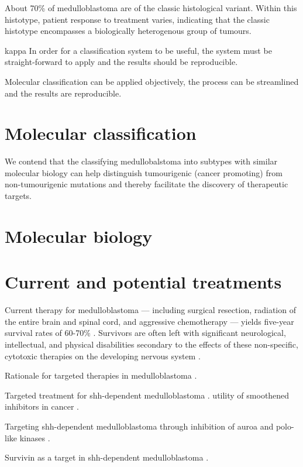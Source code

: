About 70\% of medulloblastoma are of the classic histological variant. Within this histotype, patient response to treatment varies, indicating that the classic histotype encompasses a biologically heterogenous group of tumours.

kappa
In order for a classification system to be useful, the system must be straight-forward to apply and the results should be reproducible.

Molecular classification can be applied objectively, the process can be streamlined and the results are reproducible.

\section{Molecular classification}

We contend that the classifying medullobalstoma into subtypes with similar molecular biology can help distinguish tumourigenic (cancer promoting) from non-tumourigenic mutations and thereby facilitate the discovery of therapeutic targets. 

\section{Molecular biology}


\section{Current and potential treatments}

Current therapy for medulloblastoma --- including surgical resection, radiation of the entire brain and spinal cord, and aggressive chemotherapy --- yields five-year survival rates of 60-70\% . Survivors are often left with significant neurological, intellectual, and physical disabilities secondary to the effects of these non-specific, cytotoxic therapies on the developing nervous system .

Rationale for targeted therapies in medulloblastoma .

Targeted treatment for \gls{shh}-dependent medulloblastoma .
utility of smoothened inhibitors in cancer .

Targeting \gls{shh}-dependent medulloblastoma through inhibition of auroa and polo-like kinases .

Survivin as a target in \gls{shh}-dependent medulloblastoma .

